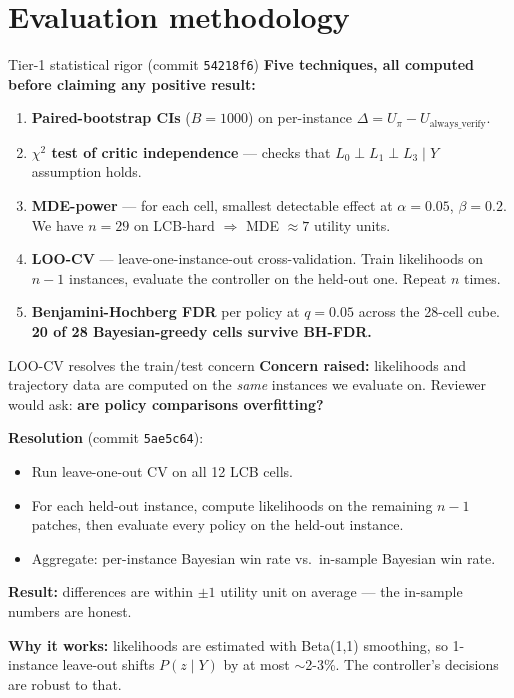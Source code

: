 \documentclass[10pt]{beamer}
\newcommand{\good}[1]{\textcolor{accentGreen}{\textbf{#1}}}
\newcommand{\bad}[1]{\textcolor{accentRed}{\textbf{#1}}}
\newcommand{\warn}[1]{\textcolor{accentOrange}{\textbf{#1}}}
\newcommand{\info}[1]{\textcolor{primaryBlue}{\textbf{#1}}}
\begin{document}

\section{Evaluation methodology}
\hypertarget{out:9}{}

\begin{frame}{Tier-1 statistical rigor (commit \texttt{54218f6})}
\vspace{0.3cm}
\info{Five techniques, all computed before claiming any positive result:}

\begin{enumerate}
\item \textcolor{accentGreen}{\textbf{Paired-bootstrap CIs}} ($B=1000$) on
  per-instance $\Delta = U_\pi - U_{\text{always\_verify}}$.
\item \textcolor{accentTeal}{\textbf{$\chi^2$ test of critic independence}} ---
  checks that $L_0 \perp L_1 \perp L_3 \mid Y$ assumption holds.
\item \textcolor{accentPurple}{\textbf{MDE-power}} --- for each cell, smallest
  detectable effect at $\alpha = 0.05$, $\beta = 0.2$. We have $n=29$ on
  LCB-hard $\Rightarrow$ MDE $\approx 7$ utility units.
\item \textcolor{accentOrange}{\textbf{LOO-CV}} --- leave-one-instance-out
  cross-validation. Train likelihoods on $n-1$ instances, evaluate the
  controller on the held-out one. Repeat $n$ times.
\item \textcolor{accentRed}{\textbf{Benjamini-Hochberg FDR}} per policy at
  $q=0.05$ across the 28-cell cube. \good{20 of 28 Bayesian-greedy cells survive
  BH-FDR.}
\end{enumerate}
\end{frame}

\begin{frame}{LOO-CV resolves the train/test concern}
\warn{Concern raised:} likelihoods and trajectory data are computed on the
\emph{same} instances we evaluate on. Reviewer would ask: \bad{are policy
comparisons overfitting?}

\good{Resolution} (commit \texttt{5ae5c64}):
\begin{itemize}
\item Run leave-one-out CV on all 12 LCB cells.
\item For each held-out instance, compute likelihoods on the remaining $n-1$
  patches, then evaluate every policy on the held-out instance.
\item Aggregate: per-instance Bayesian win rate vs.\ in-sample Bayesian win
  rate.
\end{itemize}

\good{Result:} differences are within ${\pm}1$ utility unit on average ---
the in-sample numbers are honest.

\info{Why it works:} likelihoods are estimated with Beta(1,1) smoothing, so
1-instance leave-out shifts $P(z\mid Y)$ by at most $\sim$2-3\%. The
controller's decisions are robust to that.
\end{frame}
\end{document}
